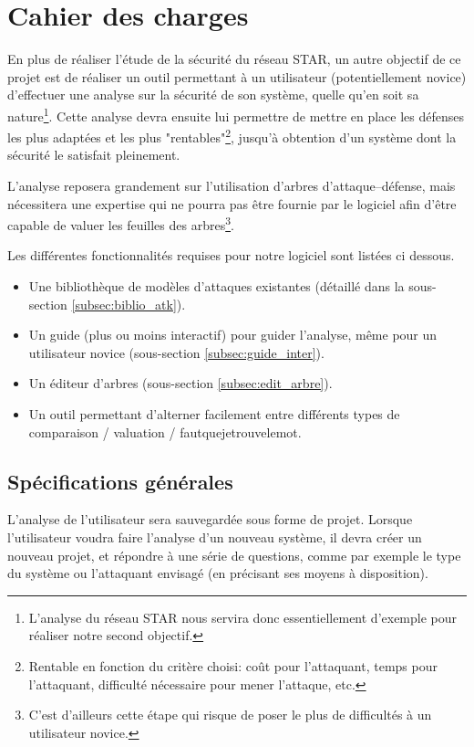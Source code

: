 \section{Cahier des charges}
    En plus de réaliser l'étude de la sécurité du réseau STAR, un autre objectif de ce projet est de réaliser un outil permettant à un utilisateur (potentiellement novice) d'effectuer une analyse sur la sécurité de son système, quelle qu'en soit sa nature\footnote{L'analyse du réseau STAR nous servira donc essentiellement d'exemple pour réaliser notre second objectif.}. Cette analyse devra ensuite lui permettre de mettre en place les défenses les plus adaptées et les plus "rentables"\footnote{Rentable en fonction du critère choisi: coût pour l'attaquant, temps pour l'attaquant, difficulté nécessaire pour mener l'attaque, etc.}, jusqu'à obtention d'un système dont la sécurité le satisfait pleinement.
    
    L'analyse reposera grandement sur l'utilisation d'arbres d'attaque--défense, mais nécessitera une expertise qui ne pourra pas être fournie par le logiciel afin d'être capable de valuer les feuilles des arbres\footnote{C'est d'ailleurs cette étape qui risque de poser le plus de difficultés à un utilisateur novice.}.
    
    Les différentes fonctionnalités requises pour notre logiciel sont listées ci dessous.
    \begin{itemize}
        \item Une bibliothèque de modèles d'attaques existantes (détaillé dans la sous-section \ref{subsec:biblio_atk}).
        \item Un guide (plus ou moins interactif) pour guider l'analyse, même pour un utilisateur novice (sous-section \ref{subsec:guide_inter}). %
        \item Un éditeur d'arbres (sous-section \ref{subsec:edit_arbre}).
        \item Un outil permettant d'alterner facilement entre différents types de comparaison / valuation / fautquejetrouvelemot.
    \end{itemize}

    \subsection{Spécifications générales}
        \label{subsec:spec_gen}
        L'analyse de l'utilisateur sera sauvegardée sous forme de projet. Lorsque l'utilisateur voudra faire l'analyse d'un nouveau système, il devra créer un nouveau projet, et répondre à une série de questions, comme par exemple le type du système ou l'attaquant envisagé (en précisant ses moyens à disposition).
        
